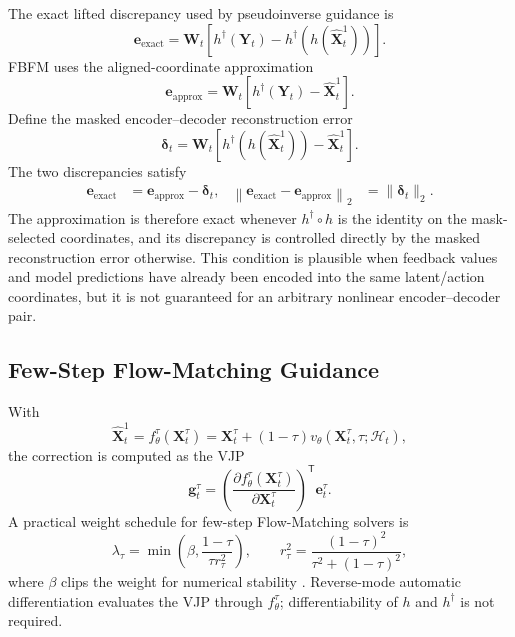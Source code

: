 The exact lifted discrepancy used by pseudoinverse guidance is
\begin{equation}
    \mathbf e_{\mathrm{exact}}
    =
    \mathbf W_t
    \left[
        h^\dagger(\mathbf Y_t)
        -
        h^\dagger\!\left(h(\hat{\mathbf X}_t^1)\right)
    \right].
\end{equation}
FBFM uses the aligned-coordinate approximation
\begin{equation}
    \mathbf e_{\mathrm{approx}}
    =
    \mathbf W_t
    \left[
        h^\dagger(\mathbf Y_t)
        -
        \hat{\mathbf X}_t^1
    \right].
\end{equation}
Define the masked encoder--decoder reconstruction error
\begin{equation}
    \boldsymbol\delta_t
    =
    \mathbf W_t
    \left[
        h^\dagger\!\left(h(\hat{\mathbf X}_t^1)\right)
        -
        \hat{\mathbf X}_t^1
    \right].
\end{equation}
The two discrepancies satisfy
\begingroup
\small
\begin{equation}
    \begin{aligned}
    \mathbf e_{\mathrm{exact}}
    &=
    \mathbf e_{\mathrm{approx}}-\boldsymbol\delta_t,
    &
    \left\|
        \mathbf e_{\mathrm{exact}}-\mathbf e_{\mathrm{approx}}
    \right\|_2
    &=
    \|\boldsymbol\delta_t\|_2.
    \end{aligned}
\end{equation}
\endgroup
The approximation is therefore exact whenever $h^\dagger\circ h$ is the identity
on the mask-selected coordinates, and its discrepancy is controlled directly by the
masked reconstruction error otherwise. This condition is plausible when feedback
values and model predictions have already been encoded into the same latent/action
coordinates, but it is not guaranteed for an arbitrary nonlinear encoder--decoder
pair.

\subsection{Few-Step Flow-Matching Guidance}

With
\begin{equation}
    \hat{\mathbf X}_t^1
    =
    f_\theta^\tau(\mathbf X_t^\tau)
    =
    \mathbf X_t^\tau
    +(1-\tau)v_\theta(\mathbf X_t^\tau,\tau;\mathcal H_t),
\end{equation}
the correction is computed as the VJP
\begin{equation}
    \mathbf g_t^\tau
    =
    \left(
        \frac{\partial f_\theta^\tau(\mathbf X_t^\tau)}
             {\partial\mathbf X_t^\tau}
    \right)^{\mathsf T}
    \mathbf e_t^\tau.
\end{equation}
A practical weight schedule for few-step Flow-Matching solvers is
\begin{equation}
    \lambda_\tau
    =
    \min\!\left(
        \beta,\frac{1-\tau}{\tau r_\tau^2}
    \right),
    \qquad
    r_\tau^2
    =
    \frac{(1-\tau)^2}{\tau^2+(1-\tau)^2},
\end{equation}
where $\beta$ clips the weight for numerical stability
\cite{black2025realtime}. Reverse-mode automatic differentiation evaluates the VJP
through $f_\theta^\tau$; differentiability of $h$ and $h^\dagger$ is not required.
